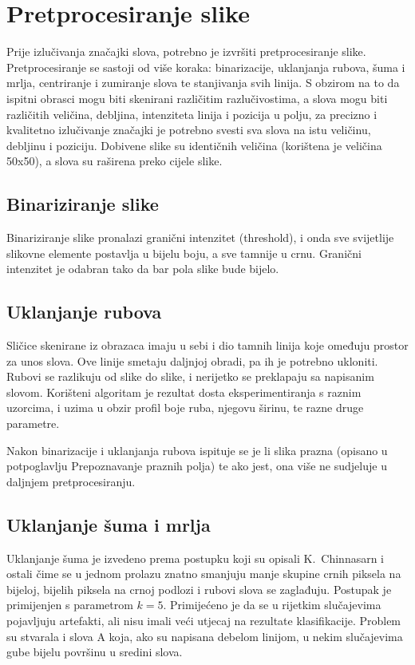 \documentclass[a4paper,twocolumn,dvipdfm]{article}
\begin{document}
\section{Pretprocesiranje slike}
Prije izlučivanja značajki slova, potrebno je izvršiti pretprocesiranje slike.
Pretprocesiranje se sastoji od više koraka: binarizacije, uklanjanja rubova,
šuma i mrlja, centriranje i zumiranje slova te stanjivanja svih linija. S
obzirom na to da ispitni obrasci mogu biti skenirani različitim razlučivostima,
a slova mogu biti različitih veličina, debljina, intenziteta linija i pozicija u
polju, za precizno i kvalitetno izlučivanje značajki je potrebno svesti sva
slova na istu veličinu, debljinu i poziciju. Dobivene slike su identičnih
veličina (korištena je veličina 50x50), a slova su raširena preko cijele slike.

\subsection{Binariziranje slike}
Binariziranje slike pronalazi granični intenzitet (threshold), i onda sve
svijetlije slikovne elemente postavlja u bijelu boju, a sve tamnije u crnu.
Granični intenzitet je odabran tako da bar pola slike bude bijelo.

\subsection{Uklanjanje rubova}
Sličice skenirane iz obrazaca imaju u sebi i dio tamnih linija koje omeđuju
prostor za unos slova. Ove linije smetaju daljnjoj obradi, pa ih je potrebno ukloniti.
Rubovi se razlikuju od slike do slike, i nerijetko se preklapaju sa napisanim slovom.
Korišteni algoritam je rezultat dosta eksperimentiranja s raznim uzorcima, i
uzima u obzir profil boje ruba, njegovu širinu, te razne druge parametre.

Nakon binarizacije i uklanjanja rubova ispituje se je li slika prazna (opisano u potpoglavlju Prepoznavanje praznih polja) te ako jest, ona više ne
sudjeluje u daljnjem pretprocesiranju.

\subsection{Uklanjanje šuma i mrlja}
Uklanjanje šuma je izvedeno prema postupku koji su opisali K.\ Chinnasarn i
ostali \cite{chinnasarn2002removing} čime se u jednom prolazu znatno smanjuju
manje skupine crnih piksela na bijeloj, bijelih piksela na crnoj podlozi i
rubovi slova se zaglađuju. Postupak je primijenjen s parametrom $k = 5$.
Primijećeno je da se u rijetkim slučajevima pojavljuju artefakti, ali nisu imali
veći utjecaj na rezultate klasifikacije. Problem su stvarala i slova A koja, ako
su napisana debelom linijom, u nekim slučajevima gube bijelu površinu u sredini
slova.
\end{document}

